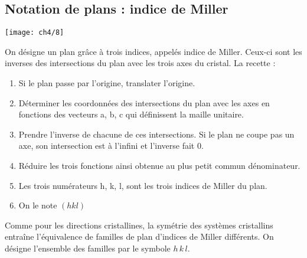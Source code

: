 	\subsection{Notation de plans : indice de Miller}
		\begin{center}
		\texttt{[image: ch4/8]}
		\end{center}	
		On désigne un plan grâce à trois indices, appelés indice de Miller. Ceux-ci sont les inverses des intersections du plan avec les trois axes du cristal. La recette : 
		\begin{enumerate}
			\item Si le plan passe par l'origine, translater l'origine.
			\item Déterminer les coordonnées des intersections du plan avec les axes en fonctions des vecteurs a, b, c qui définissent la maille unitaire. 
			\item Prendre l'inverse de chacune de ces intersections. Si le plan ne coupe pas un axe, son intersection est à l'infini et l'inverse fait 0.
			\item Réduire les trois fonctions ainsi obtenue au plus petit commun dénominateur.
			\item Les trois numérateurs h, k, l, sont les trois indices de Miller du plan.
			\item On le note $(hkl)$
		\end{enumerate}
		Comme pour les directions cristallines, la symétrie des systèmes cristallins entraîne l'équivalence de familles de plan d'indices de Miller différents. On désigne l'ensemble des familles par le symbole ${h \, k \, l}$. 